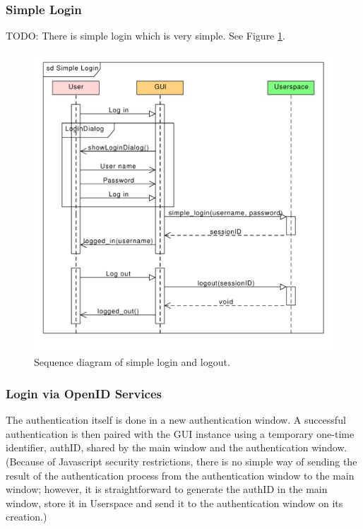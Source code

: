 \subsubsection{Simple Login}
\label{subsec:simple_login}

TODO: There is simple login which is very simple. See Figure \ref{gui:sd:simple_login}.


\begin{figure}[h]
\begin{center}
\includegraphics[scale=0.65]{figures/simple_login_sequence.pdf}
\end{center}
\caption{Sequence diagram of simple login and logout.}\label{gui:sd:simple_login}
\end{figure}

\subsubsection{Login via OpenID Services}
\label{subsubsec:gui_openid}

The authentication itself is done in a new authentication window.
A successful authentication is then paired with the GUI instance using a temporary one-time identifier, authID, shared by the main window and the authentication window.
(Because of Javascript security restrictions, there is no simple way of sending the result of the authentication process from the authentication window to the main window;
however, it is straightforward to generate the authID in the main window, store it in Userspace and send it to the authentication window on its creation.)


